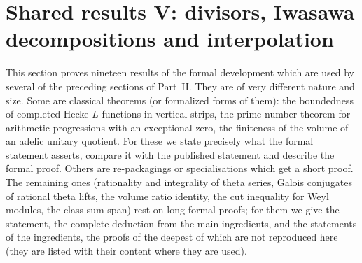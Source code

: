 \section{Shared results V: divisors, Iwasawa decompositions and interpolation}\label{sec:pf:sh-div}

\providecommand{\shdivGBig}{\sfname{GBig}}
\providecommand{\shdivGC}{\Gamma_{\C}}
\providecommand{\shdivEm}{\mathrm{E}_{\mathrm{main}}}
\providecommand{\shdivLi}{\operatorname{Li}}
\providecommand{\shdivPic}{\operatorname{Pic}}
\providecommand{\shdivex}{\operatorname{ex}}
\providecommand{\shdivEv}{\sfname{Ev}}

This section proves nineteen results of the formal development \cite{LeanSource2026} which are used by several of the
preceding sections of Part~II. They are of very different nature and size. Some are classical theorems (or formalized
forms of them): the boundedness of completed Hecke $L$-functions in vertical strips, the prime number theorem for arithmetic
progressions with an exceptional zero, the finiteness of the volume of an adelic unitary quotient. For these we state
precisely what the formal statement asserts, compare it with the published statement and describe the formal proof. Others
are re-packagings or specialisations which get a short proof. The remaining ones (rationality and integrality of theta series,
Galois conjugates of rational theta lifts, the volume ratio identity, the cut inequality for Weyl modules, the class sum span)
rest on long formal proofs; for them we give the statement, the complete deduction from the main ingredients, and the
statements of the ingredients, the proofs of the deepest of which are not reproduced here (they are listed with their
content where they are used).

